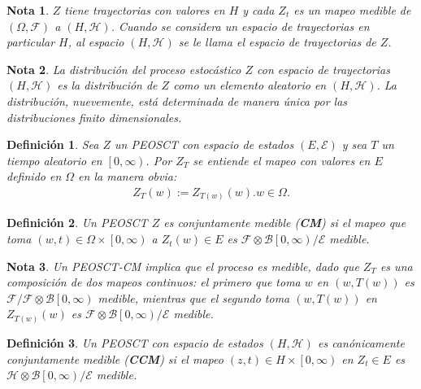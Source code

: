 \documentclass{article}
\newtheorem{Def}{Definición}
\newtheorem{Note}{Nota}
\begin{document}
\begin{Note}
$Z$ tiene trayectorias con valores en $H$ y cada $Z_{t}$ es un mapeo medible de $\left(\Omega,\mathcal{F}\right)$ a $\left(H,\mathcal{H}\right)$. Cuando se considera un espacio de trayectorias en particular $H$, al espacio $\left(H,\mathcal{H}\right)$ se le llama el espacio de trayectorias de $Z$.
\end{Note}

\begin{Note}
La distribuci\'on del proceso estoc\'astico $Z$ con espacio de trayectorias $\left(H,\mathcal{H}\right)$ es la distribuci\'on de $Z$ como  un elemento aleatorio en $\left(H,\mathcal{H}\right)$. La distribuci\'on, nuevemente, est\'a determinada de manera \'unica por las distribuciones finito dimensionales.
\end{Note}


\begin{Def}
Sea $Z$ un PEOSCT  con espacio de estados $\left(E,\mathcal{E}\right)$ y sea $T$ un tiempo aleatorio en $\left[0,\infty\right)$. Por $Z_{T}$ se entiende el mapeo con valores en $E$ definido en $\Omega$ en la manera obvia:
\begin{eqnarray*}
Z_{T}\left(w\right):=Z_{T\left(w\right)}\left(w\right). w\in\Omega.
\end{eqnarray*}
\end{Def}

\begin{Def}
Un PEOSCT $Z$ es conjuntamente medible (\textbf{CM}) si el mapeo que toma $\left(w,t\right)\in\Omega\times\left[0,\infty\right)$ a $Z_{t}\left(w\right)\in E$ es $\mathcal{F}\otimes\mathcal{B}\left[0,\infty\right)/\mathcal{E}$ medible.
\end{Def}

\begin{Note}
Un PEOSCT-CM implica que el proceso es medible, dado que $Z_{T}$ es una composici\'on  de dos mapeos continuos: el primero que toma $w$ en $\left(w,T\left(w\right)\right)$ es $\mathcal{F}/\mathcal{F}\otimes\mathcal{B}\left[0,\infty\right)$ medible, mientras que el segundo toma $\left(w,T\left(w\right)\right)$ en $Z_{T\left(w\right)}\left(w\right)$ es $\mathcal{F}\otimes\mathcal{B}\left[0,\infty\right)/\mathcal{E}$ medible.
\end{Note}


\begin{Def}
Un PEOSCT con espacio de estados $\left(H,\mathcal{H}\right)$ es can\'onicamente conjuntamente medible (\textbf{CCM}) si el mapeo $\left(z,t\right)\in H\times\left[0,\infty\right)$ en $Z_{t}\in E$ es $\mathcal{H}\otimes\mathcal{B}\left[0,\infty\right)/\mathcal{E}$ medible.
\end{Def}
\end{document}
